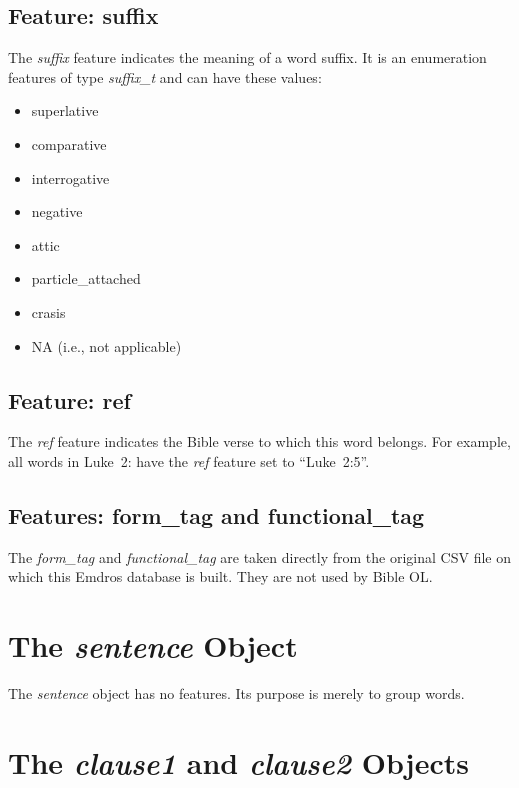 \documentclass[11pt,oneside,a4paper]{memoir}
\newcommand*{\bibleref}[3]{#1~#2\thinspace:\thinspace#3}
\begin{document}
\subsection{Feature: suffix}

The \emph{suffix} feature indicates the meaning of a word suffix. It is an enumeration features of
type \emph{suffix\_t} and can have these values:

\begin{itemize}
\item superlative
\item comparative
\item interrogative
\item negative
\item attic
\item particle\_attached
\item crasis
\item NA (i.e., not applicable)
\end{itemize}

\subsection{Feature: ref}

The \emph{ref} feature indicates the Bible verse to which this word belongs. For example, all words
in \bibleref{Luke}{2}{5} have the \emph{ref} feature set to ``Luke~2:5''.

\subsection{Features: form\_tag and functional\_tag}

The \emph{form\_tag} and \emph{functional\_tag} are taken directly from the original CSV file on
which this Emdros database is built. They are not used by Bible OL.

\section{The \emph{sentence} Object}

The \emph{sentence} object has no features. Its purpose is merely to group words.

\section{The \emph{clause1} and \emph{clause2} Objects}
\end{document}
